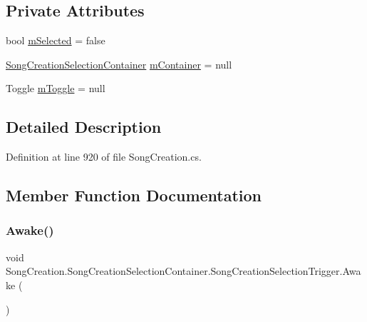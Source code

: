 \subsection*{Private Attributes}
\begin{DoxyCompactItemize}
\item 
bool \hyperlink{class_song_creation_1_1_song_creation_selection_container_1_1_song_creation_selection_trigger_a49ffd4516ec7982b1683a44b4f22de74}{m\+Selected} = false
\item 
\hyperlink{class_song_creation_1_1_song_creation_selection_container}{Song\+Creation\+Selection\+Container} \hyperlink{class_song_creation_1_1_song_creation_selection_container_1_1_song_creation_selection_trigger_a23a094f17b949a4ea153f66c73e42578}{m\+Container} = null
\item 
Toggle \hyperlink{class_song_creation_1_1_song_creation_selection_container_1_1_song_creation_selection_trigger_affc6248c907c4357b0a0a30b86635f3a}{m\+Toggle} = null
\end{DoxyCompactItemize}


\subsection{Detailed Description}


Definition at line 920 of file Song\+Creation.\+cs.



\subsection{Member Function Documentation}
\mbox{\label{class_song_creation_1_1_song_creation_selection_container_1_1_song_creation_selection_trigger_a1d7d3017d7cc312657926de99f04d73c}} 
\subsubsection{\texorpdfstring{Awake()}{Awake()}}
{\footnotesize\ttfamily void Song\+Creation.\+Song\+Creation\+Selection\+Container.\+Song\+Creation\+Selection\+Trigger.\+Awake (\begin{DoxyParamCaption}{ }\end{DoxyParamCaption})\hspace{0.3cm}{\ttfamily [private]}}



